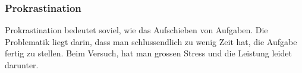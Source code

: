 \subsubsection{Prokrastination}
Prokrastination bedeutet soviel, wie das Aufschieben von Aufgaben. Die Problematik liegt darin, dass man schlussendlich zu wenig Zeit hat, die Aufgabe fertig zu stellen. Beim Versuch, hat man grossen Stress und die Leistung leidet darunter.
